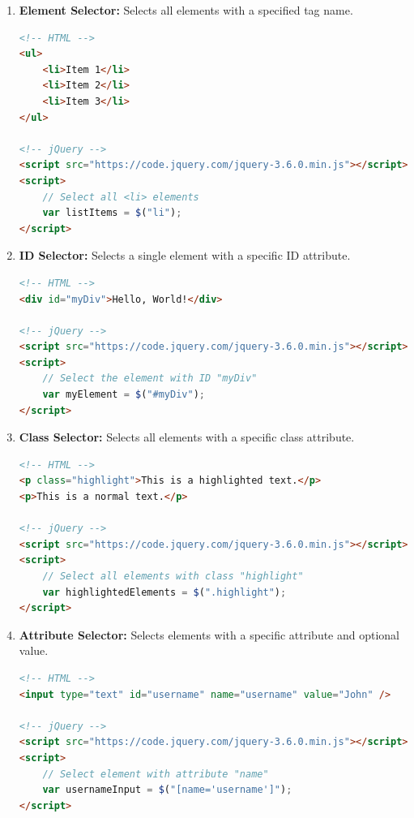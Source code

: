 \documentclass[11pt]{article}
\begin{document}
\begin{enumerate}

    \item \textbf{Element Selector:} Selects all elements with a specified tag name.

          \begin{lstlisting}[language=HTML, caption=Example: Element Selector]
<!-- HTML -->
<ul>
    <li>Item 1</li>
    <li>Item 2</li>
    <li>Item 3</li>
</ul>

<!-- jQuery -->
<script src="https://code.jquery.com/jquery-3.6.0.min.js"></script>
<script>
    // Select all <li> elements
    var listItems = $("li");
</script>
\end{lstlisting}

    \item \textbf{ID Selector:} Selects a single element with a specific ID attribute.

          \begin{lstlisting}[language=HTML, caption=Example: ID Selector]
<!-- HTML -->
<div id="myDiv">Hello, World!</div>

<!-- jQuery -->
<script src="https://code.jquery.com/jquery-3.6.0.min.js"></script>
<script>
    // Select the element with ID "myDiv"
    var myElement = $("#myDiv");
</script>
\end{lstlisting}

    \item \textbf{Class Selector:} Selects all elements with a specific class attribute.

          \begin{lstlisting}[language=HTML, caption=Example: Class Selector]
<!-- HTML -->
<p class="highlight">This is a highlighted text.</p>
<p>This is a normal text.</p>

<!-- jQuery -->
<script src="https://code.jquery.com/jquery-3.6.0.min.js"></script>
<script>
    // Select all elements with class "highlight"
    var highlightedElements = $(".highlight");
</script>
\end{lstlisting}

    \item \textbf{Attribute Selector:} Selects elements with a specific attribute and optional value.

          \begin{lstlisting}[language=HTML, caption=Example: Attribute Selector]
<!-- HTML -->
<input type="text" id="username" name="username" value="John" />

<!-- jQuery -->
<script src="https://code.jquery.com/jquery-3.6.0.min.js"></script>
<script>
    // Select element with attribute "name"
    var usernameInput = $("[name='username']");
</script>
\end{lstlisting}


\end{enumerate}
\end{document}
